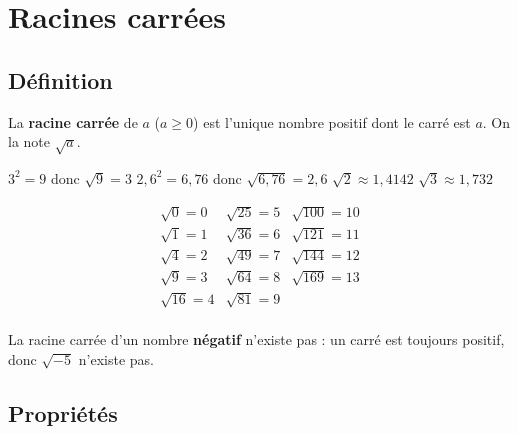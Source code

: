 \section{Racines carrées}

\subsection{Définition}

\begin{defin}
	La \textbf{racine carrée} de $a$ ($a \ge 0$) est l'unique nombre positif dont le carré est $a$. On la note $\sqrt{a}$.
\end{defin}

\begin{ex}
	$3^2 = 9$ donc $\sqrt{9} = 3$ \qquad $2{,}6^2 = 6{,}76$ donc $\sqrt{6{,}76} = 2{,}6$ \qquad $\sqrt{2} \approx 1{,}4142$ \qquad $\sqrt{3} \approx 1{,}732$
\end{ex}

\begin{prop}

	\[
		\begin{array}{lllll}
			\sqrt{0} = 0  & \sqrt{25} = 5 & \sqrt{100} = 10 \\
			\sqrt{1} = 1  & \sqrt{36} = 6 & \sqrt{121} = 11 \\
			\sqrt{4} = 2  & \sqrt{49} = 7 & \sqrt{144} = 12 \\
			\sqrt{9} = 3  & \sqrt{64} = 8 & \sqrt{169} = 13 \\
			\sqrt{16} = 4 & \sqrt{81} = 9 &                 \\
		\end{array}
	\]

\end{prop}

\begin{rem}
	La racine carrée d'un nombre \textbf{négatif} n'existe pas : un carré est toujours positif, donc $\sqrt{-5}$ n'existe pas.
\end{rem}

\subsection{Propriétés}

